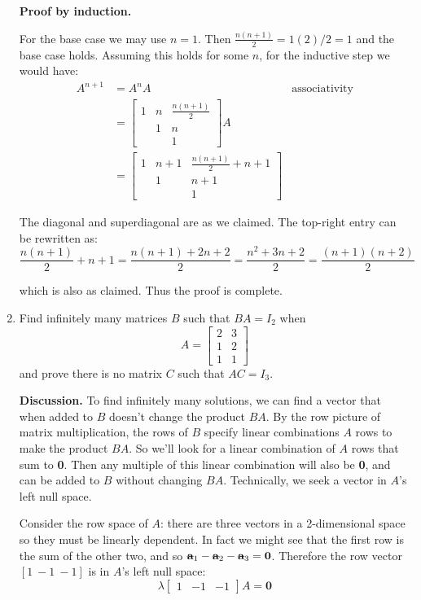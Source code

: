 \documentclass[main.tex]{subfiles}
\begin{document}
\begin{enumerate}[label=1.\arabic*]
\textbf{Proof by induction.}

For the base case we may use $n = 1$. Then $\frac{n(n+1)}{2} = 1(2)/2 = 1$ and the base case holds.
Assuming this holds for some $n$, for the inductive step we would have:
\begin{align*}
  A^{n+1} & = A^n A                       & \text{associativity} \\
          & = \begin{bmatrix} 1 & n & \frac{n(n+1)}{2} \\ & 1 & n \\ & & 1 \end{bmatrix} A                        \\
          & = \begin{bmatrix} 1 & n + 1 & \frac{n(n+1)}{2} + n + 1 \\ & 1 & n + 1 \\ & & 1 \end{bmatrix}
\end{align*}

The diagonal and superdiagonal are as we claimed. The top-right entry can be rewritten as:
$$\frac{n(n+1)}{2} + n + 1 = \frac{n(n+1) + 2n + 2}{2} = \frac{n^2 + 3n + 2}{2} = \frac{(n+1)(n+2)}{2}$$

which is also as claimed. Thus the proof is complete.
\setcounter{enumi}{13}
\item Find infinitely many matrices $B$ such that $BA = I_2$ when
$$A = \begin{bmatrix} 2 & 3 \\ 1 & 2 \\ 1 & 1 \end{bmatrix}$$
and prove there is no matrix $C$ such that $AC = I_3$.

\textbf{Discussion.} To find infinitely many solutions, we can find a vector that when added to
$B$ doesn't change the product $BA$. By the row picture of matrix multiplication, the rows of $B$ specify linear combinations $A$ rows to make the product $BA$. So we'll look for a linear combination of $A$ rows that sum to \textbf{0}. Then any multiple of this linear combination will also be \textbf{0}, and can be added to $B$ without changing $BA$. Technically, we seek a vector in $A$'s left null space.

Consider the row space of $A$: there are three vectors in a 2-dimensional space so they
must be linearly dependent. In fact we might see that the first row is the sum of the other two, and so
$\rowvec{a}_1 - \rowvec{a}_2 - \rowvec{a}_3 = \mathbf{0}$. Therefore the row vector $[1 \ -1\  -1]$ is in $A$'s left null
space:
$$\lambda \begin{bmatrix} 1 & -1 & -1 \end{bmatrix} A = \mathbf{0}$$


\end{enumerate}
\end{document}
